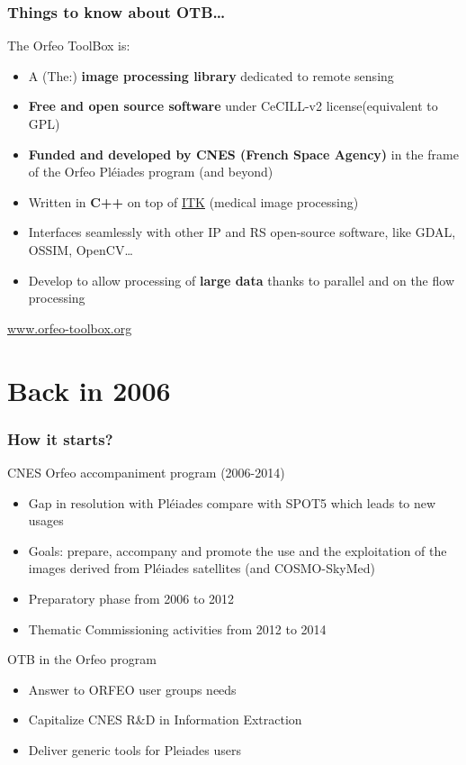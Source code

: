 \documentclass[8pt]{beamer}
\begin{document}
\begin{frame}
\frametitle{Things to know about OTB\ldots}
\begin{block}{The Orfeo ToolBox is:}
\begin{itemize}
\item A (The:) \textbf{image processing library} dedicated to remote sensing
\item \textbf{Free and open source software} under CeCILL-v2 license(equivalent to GPL)
\item \textbf{Funded and developed by CNES (French Space Agency)} in the frame
  of the Orfeo Pléiades program (and beyond)
\item Written in \textbf{C++} on top of \href{www.itk.org}{ITK} (medical image
  processing)
\item Interfaces seamlessly with other IP and RS open-source software, like GDAL, OSSIM, OpenCV\ldots
\item Develop to allow processing of \textbf{large data} thanks to parallel and on the flow processing
\end{itemize}
\end{block}

\begin{center}
{\huge\textcolor{red}{\url{www.orfeo-toolbox.org}}}
\end{center}

\end{frame}

\section{Back in 2006}

\begin{frame}
\frametitle{How it starts?}

\begin{block}{CNES Orfeo accompaniment program (2006-2014)}
\begin{itemize}
\item Gap in resolution with Pléiades compare with SPOT5 which leads to new usages
\item Goals: prepare, accompany and promote the use and the exploitation of the images derived from Pléiades satellites (and COSMO-SkyMed)
\item Preparatory phase from 2006 to 2012
\item Thematic Commissioning activities from 2012 to 2014
\end{itemize}
\end{block}

\begin{block}{OTB in the Orfeo program}
\begin{itemize}
\item Answer to ORFEO user groups needs
\item Capitalize CNES R\&D in Information Extraction
\item Deliver generic tools for Pleiades users
\end{itemize}
\end{block}
\end{frame}
\end{document}
